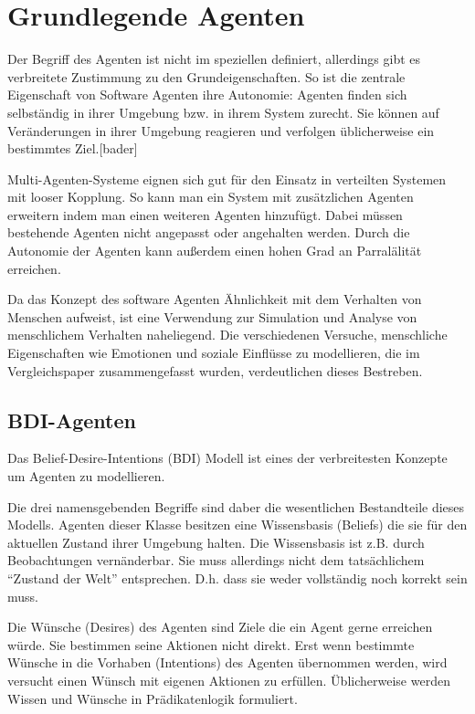 

\chapter{Grundlegende Agenten}
Der Begriff des Agenten ist nicht im speziellen definiert, allerdings gibt es verbreitete Zustimmung zu den Grundeigenschaften.
So ist die zentrale Eigenschaft von Software Agenten ihre Autonomie: Agenten finden sich selbständig in ihrer Umgebung bzw. in ihrem System zurecht.
Sie können auf Veränderungen in ihrer Umgebung reagieren und verfolgen üblicherweise ein bestimmtes Ziel.[bader]%

Multi-Agenten-Systeme eignen sich gut für den Einsatz in verteilten Systemen mit looser Kopplung.
So kann man ein System mit zusätzlichen Agenten erweitern indem man einen weiteren Agenten hinzufügt.
Dabei müssen bestehende Agenten nicht angepasst oder angehalten werden.
Durch die Autonomie der Agenten kann außerdem einen hohen Grad an Parralälität erreichen.

Da das Konzept des software Agenten Ähnlichkeit mit dem Verhalten von Menschen aufweist, ist eine Verwendung zur Simulation und Analyse von menschlichem Verhalten naheliegend.
Die verschiedenen Versuche, menschliche Eigenschaften wie Emotionen und soziale Einflüsse zu modellieren, die im Vergleichspaper zusammengefasst wurden, verdeutlichen dieses Bestreben.

\section{BDI-Agenten}
Das Belief-Desire-Intentions (BDI) Modell ist eines der verbreitesten Konzepte um Agenten zu modellieren.

Die drei namensgebenden Begriffe sind daber die wesentlichen Bestandteile dieses Modells.
Agenten dieser Klasse besitzen eine Wissensbasis (Beliefs) die sie für den aktuellen Zustand ihrer Umgebung halten.
Die Wissensbasis ist z.B. durch Beobachtungen vernänderbar.
Sie muss allerdings nicht dem tatsächlichem \enquote{Zustand der Welt} entsprechen.
D.h. dass sie weder vollständig noch korrekt sein muss.

Die Wünsche (Desires) des Agenten sind Ziele die ein Agent gerne erreichen würde.
Sie bestimmen seine Aktionen nicht direkt. 
Erst wenn bestimmte Wünsche in die Vorhaben (Intentions) des Agenten übernommen werden, wird versucht einen Wünsch mit eigenen Aktionen zu erfüllen.
Üblicherweise werden Wissen und Wünsche in Prädikatenlogik formuliert.

